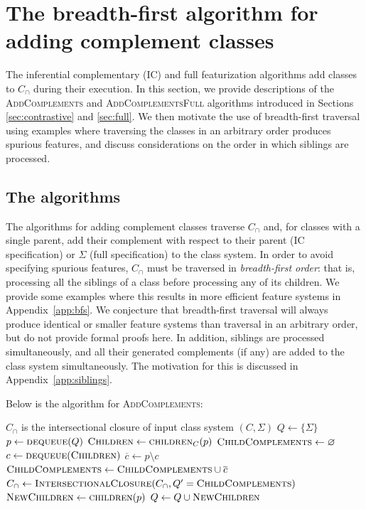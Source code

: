 \documentclass[12pt, oneside]{article}   	%
\begin{document}
\section{The breadth-first algorithm for adding complement classes}
\label{app:complements}

The inferential complementary (IC) and full featurization algorithms add classes to $C_\cap$ during their execution. In this section, we provide descriptions of the \textsc{AddComplements} and \textsc{AddComplementsFull} algorithms introduced in Sections \ref{sec:contrastive} and \ref{sec:full}. We then motivate the use of breadth-first traversal using examples where traversing the classes in an arbitrary order produces spurious features, and discuss considerations on the order in which siblings are processed.

\subsection{The algorithms}

The algorithms for adding complement classes traverse $C_\cap$ and, for classes with a single parent, add their complement with respect to their parent (IC specification) or $\Sigma$ (full specification) to the class system. In order to avoid specifying spurious features, $C_\cap$ must be traversed in \textit{breadth-first order}: that is, processing all the siblings of a class before processing any of its children. We provide some examples where this results in more efficient feature systems in Appendix~\ref{app:bfs}. We conjecture that breadth-first traversal will always produce identical or smaller feature systems than traversal in an arbitrary order, but do not provide formal proofs here. In addition, siblings are processed simultaneously, and all their generated complements (if any) are added to the class system simultaneously. The motivation for this is discussed in Appendix~\ref{app:siblings}.

Below is the algorithm for \textsc{AddComplements}:
\noindent \begin{algorithmic}
	\singlespacing
	\REQUIRE $C_\cap$ is the intersectional closure of input class system $(C, \Sigma)$
	\STATE
	\STATE $Q \leftarrow \{\Sigma\}$
	\STATE
	\STATE $p \leftarrow \textsc{dequeue}(Q)$
	\STATE $\textsc{Children} \leftarrow \textsc{children}_C(p)$
	\STATE $\textsc{ChildComplements} \leftarrow \varnothing$
	\STATE $c \leftarrow \textsc{dequeue}(\textsc{Children})$
	\STATE $\overline{c} \leftarrow p \setminus c$
	\STATE $\textsc{ChildComplements} \leftarrow \textsc{ChildComplements} \cup \overline{c}$
	\ENDIF
	\ENDWHILE
	\STATE $C_\cap \leftarrow \textsc{IntersectionalClosure}(C_\cap, Q' = \textsc{ChildComplements})$
	\STATE $\textsc{NewChildren} \leftarrow \textsc{children}(p)$
	\STATE $Q \leftarrow Q \cup \textsc{NewChildren}$
	\ENDWHILE
\end{algorithmic}
\doublespacing
\end{document}
